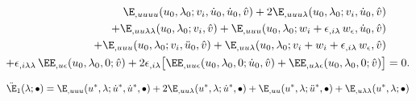 \begin{equation}
  \label{eq:20221116152647}
  \begin{aligned}[b]
    \E_{,uuuu}(u_0, \lambda_0; v_i, \dot{u}_0, \dot{u}_0, \hat{v}) + 2\E_{,uuu\lambda}(u_0, \lambda_0; v_i, \dot{u}_0, \hat{v}) &\\
    + \E_{,uu\lambda\lambda}(u_0, \lambda_0; v_i, \hat{v}) + \E_{,uuu}(u_0, \lambda_0; w_i + \epsilon_{,i\lambda} \, w_{\epsilon}, \dot{u}_0, \hat{v}) &\\
    + \E_{,uuu}(u_0, \lambda_0; v_i, \ddot{u}_0, \hat{v}) + \E_{,uu\lambda}(u_0, \lambda_0; v_i + w_{i} + \epsilon_{,i\lambda} \, w_{\epsilon}, \hat{v}) &\\
    + \epsilon_{,i\lambda\lambda} \, \EE_{,u\epsilon}(u_0, \lambda_0, 0; \hat{v}) + 2\epsilon_{,i\lambda} \bigl[ \EE_{,uu\epsilon}(u_0, \lambda_0, 0; \dot{u}_0, \hat{v}) + \EE_{,u\lambda\epsilon}(u_0, \lambda_0, 0; \hat{v}) \bigr] &= 0.
  \end{aligned}
\end{equation}

\begin{equation*}
  \ddot{\E}_1(\lambda; \bullet) = \E_{,uuu}(u^\ast, \lambda; \dot{u}^\ast, \dot{u}^\ast, \bullet) + 2\E_{,uu\lambda}(u^\ast, \lambda; \dot{u}^\ast, \bullet) + \E_{,uu}(u^\ast, \lambda; \ddot{u}^\ast, \bullet) + \E_{,u\lambda\lambda}(u^\ast, \lambda; \bullet)
\end{equation*}



